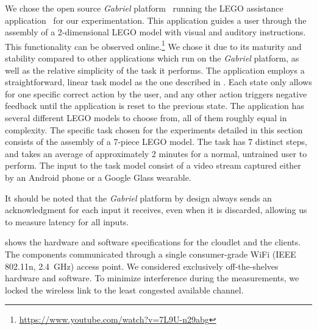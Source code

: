 
We chose the open source \emph{Gabriel} platform~\cite{Ha:TowardsWearableCogAssist} running the LEGO assistance application~\cite{Chen:AnEmpiricalStudyOfLatency} for our experimentation.
This application guides a user through the assembly of a 2-dimensional LEGO model with visual and auditory instructions.
This functionality can be observed online.\footnote{\url{https://www.youtube.com/watch?v=7L9U-n29abg}}
We chose it due to its maturity and stability compared to other applications which run on the \emph{Gabriel} platform, as well as the relative simplicity of the task it performs.
The application employs a straightforward, linear task model as the one described in .
Each state only allows for one specific correct action by the user, and any other action triggers negative feedback until the application is reset to the previous state.
The application has several different LEGO models to choose from, all of them roughly equal in complexity.
The specific task chosen for the experiments detailed in this section consists of the assembly of a 7-piece LEGO model.
The task has 7 distinct steps, and takes an average of approximately 2 minutes for a normal, untrained user to perform.
The input to the task model consist of a video stream captured either by an Android phone or a Google Glass wearable.

It should be noted that the \emph{Gabriel} platform by design always sends an acknowledgment for each input it receives, even when it is discarded, allowing us to measure latency for all inputs.


 shows the hardware and software specifications for the cloudlet and the clients.
The components communicated through a single consumer-grade WiFi (IEEE 802.11n, \SI{2.4}{\giga\hertz}) access point.
We considered exclusively off-the-shelves hardware and software.
To minimize interference during the measurements, we locked the wireless link to the least congested available channel.

